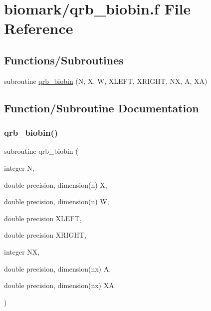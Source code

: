 \hypertarget{qrb__biobin_8f}{}\section{biomark/qrb\+\_\+biobin.f File Reference}
\label{qrb__biobin_8f}
\subsection*{Functions/\+Subroutines}
\begin{DoxyCompactItemize}
\item 
subroutine \hyperlink{qrb__biobin_8f_af4a26e8d885af10d990933cdc1aed36d}{qrb\+\_\+biobin} (N, X, W, X\+L\+E\+FT, X\+R\+I\+G\+HT, NX, A, XA)
\end{DoxyCompactItemize}


\subsection{Function/\+Subroutine Documentation}
\mbox{\label{qrb__biobin_8f_af4a26e8d885af10d990933cdc1aed36d}} 
\subsubsection{\texorpdfstring{qrb\+\_\+biobin()}{qrb\_biobin()}}
{\footnotesize\ttfamily subroutine qrb\+\_\+biobin (\begin{DoxyParamCaption}\item[{integer}]{N,  }\item[{double precision, dimension(n)}]{X,  }\item[{double precision, dimension(n)}]{W,  }\item[{double precision}]{X\+L\+E\+FT,  }\item[{double precision}]{X\+R\+I\+G\+HT,  }\item[{integer}]{NX,  }\item[{double precision, dimension(nx)}]{A,  }\item[{double precision, dimension(nx)}]{XA }\end{DoxyParamCaption})}

